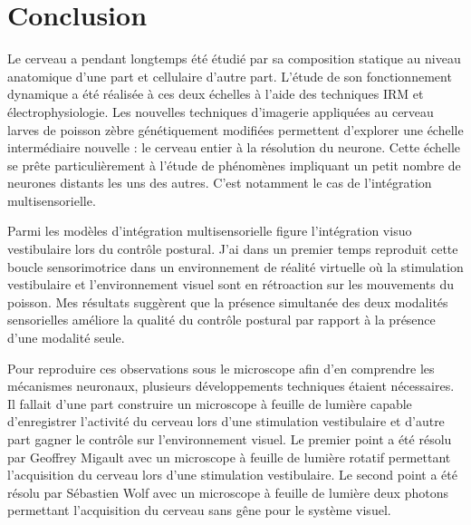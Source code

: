 \chapter{Conclusion}\label{chapV}





Le cerveau a pendant longtemps été étudié par sa composition statique au niveau anatomique d'une part et cellulaire d'autre part. L'étude de son fonctionnement dynamique a été réalisée à ces deux échelles à l'aide des techniques IRM et électrophysiologie. Les nouvelles techniques d'imagerie appliquées au cerveau larves de poisson zèbre génétiquement modifiées permettent d'explorer une échelle intermédiaire nouvelle : le cerveau entier à la résolution du neurone. Cette échelle se prête particulièrement à l'étude de phénomènes impliquant un petit nombre de neurones distants les uns des autres. C'est notamment le cas de l'intégration multisensorielle.

Parmi les modèles d'intégration multisensorielle figure l'intégration visuo vestibulaire lors du contrôle postural. J'ai dans un premier temps reproduit cette boucle sensorimotrice dans un environnement de réalité virtuelle où la stimulation vestibulaire et l'environnement visuel sont en rétroaction sur les mouvements du poisson. Mes résultats suggèrent que la présence simultanée des deux modalités sensorielles améliore la qualité du contrôle postural par rapport à la présence d'une modalité seule.

Pour reproduire ces observations sous le microscope afin d'en comprendre les mécanismes neuronaux, plusieurs développements techniques étaient nécessaires. Il fallait d'une part construire un microscope à feuille de lumière capable d'enregistrer l'activité du cerveau lors d'une stimulation vestibulaire et d'autre part gagner le contrôle sur l'environnement visuel. Le premier point a été résolu par Geoffrey Migault avec un microscope à feuille de lumière rotatif permettant l'acquisition du cerveau lors d'une stimulation vestibulaire. Le second point a été résolu par Sébastien Wolf avec un microscope à feuille de lumière deux photons permettant l'acquisition du cerveau sans gêne pour le système visuel.

